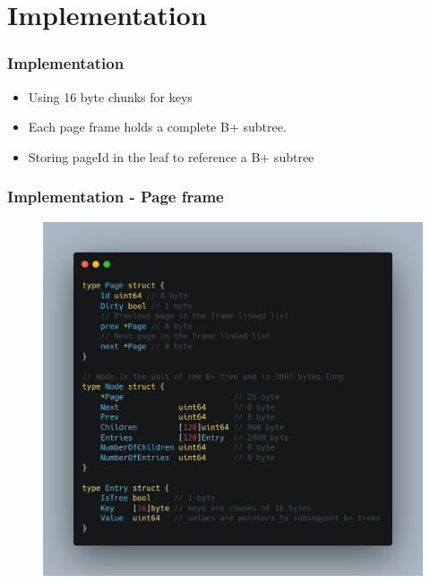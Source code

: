 \documentclass[aspectratio=169]{beamer}
\begin{document}
\section{Implementation}
\begin{frame}[t]
    \frametitle{Implementation}
    \begin{itemize}
    	\item Using 16 byte chunks for keys
    	\item Each page frame holds a complete B+ subtree.
    	\item Storing pageId in the leaf to reference a B+ subtree
    \end{itemize}
\end{frame}

\begin{frame}[t]
	\frametitle{Implementation - Page frame}
	\begin{figure}[h!]
		\includegraphics[scale=0.16]{code_page}
	\end{figure}
	\centering
\end{frame}
\end{document}
